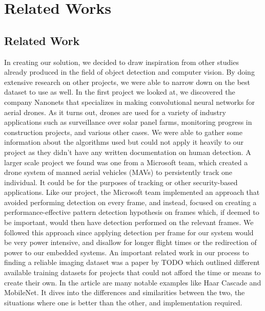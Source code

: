 \chapter{Related Works}

\section{Related Work}

In creating our solution, we decided to draw inspiration from other studies already produced in the field of object detection and computer vision. By doing extensive research on other projects, we were able to narrow down on the best dataset to use as well. 
In the first project we looked at, we discovered the company Nanonets that specializes in making convolutional neural networks for aerial drones. As it turns out, drones are used for a variety of industry applications such as surveillance over solar panel farms, monitoring progress in construction projects, and various other cases. We were able to gather some information about the algorithms used but could not apply it heavily to our project as they didn’t have any written documentation on human detection. 
A larger scale project we found was one from a Microsoft team, which created a drone system of manned aerial vehicles (MAVs) to persistently track one individual. It could be for the purposes of tracking or other security-based applications. Like our project, the Microsoft team implemented an approach that avoided performing detection on every frame, and instead, focused on creating a performance-effective pattern detection hypothesis on frames which, if deemed to be important, would then have detection performed on the relevant frames. We followed this approach since applying detection per frame for our system would be very power intensive, and disallow for longer flight times or the redirection of power to our embedded systems. 
An important related work in our process to finding a reliable imaging dataset was a paper by TODO which outlined different available training datasets for projects that could not afford the time or means to create their own. In the article are many notable examples like Haar Cascade and MobileNet. It dives into the differences and similarities between the two, the situations where one is better than the other, and implementation required. 
% 
